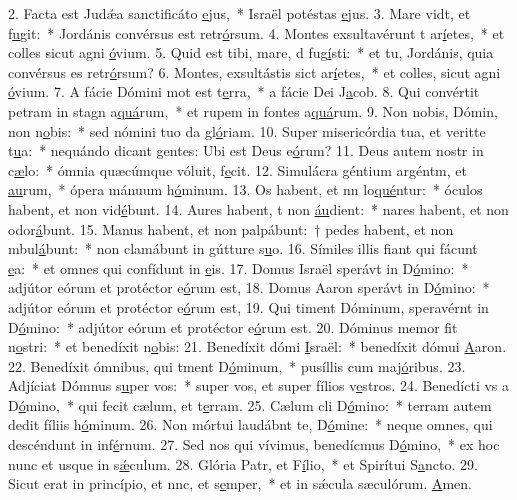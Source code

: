 2. Facta est Judǽa sanctificáto \uline{e}jus,~* Israël potéstas \uline{e}jus.
3. Mare vidt, et f\uline{u}git:~* Jordánis convérsus est retr\uline{ó}rsum.
4. Montes exsultavérunt t ar\uline{í}etes,~* et colles sicut agni \uline{ó}vium.
5. Quid est tibi, mare, d fug\uline{í}sti:~* et tu, Jordánis, quia convérsus es retr\uline{ó}rsum?
6. Montes, exsultástis sict ar\uline{í}etes,~* et colles, sicut agni \uline{ó}vium.
7. A fácie Dómini mot est t\uline{e}rra,~* a fácie Dei J\uline{a}cob.
8. Qui convértit petram in stagn a\uline{quá}rum,~* et rupem in fontes a\uline{quá}rum.
9. Non nobis, Dómin, non n\uline{o}bis:~* sed nómini tuo da gl\uline{ó}riam.
10. Super misericórdia tua, et veritte t\uline{u}a:~* nequándo dicant gentes: Ubi est Deus e\uline{ó}rum?
11. Deus autem nostr in c\uline{æ}lo:~* ómnia quæcúmque vóluit, f\uline{e}cit.
12. Simulácra géntium argéntm, et \uline{au}rum,~* ópera mánuum h\uline{ó}minum.
13. Os habent, et nn lo\uline{qué}ntur:~* óculos habent, et non vid\uline{é}bunt.
14. Aures habent, t non \uline{áu}dient:~* nares habent, et non odor\uline{á}bunt.
15. Manus habent, et non palpábunt:~† pedes habent, et non mbul\uline{á}bunt:~* non clamábunt in gútture s\uline{u}o.
16. Símiles illis fiant qui fácunt \uline{e}a:~* et omnes qui confídunt in \uline{e}is.
17. Domus Israël sperávt in D\uline{ó}mino:~* adjútor eórum et protéctor e\uline{ó}rum est,
18. Domus Aaron sperávt in D\uline{ó}mino:~* adjútor eórum et protéctor e\uline{ó}rum est,
19. Qui timent Dóminum, speravérnt in D\uline{ó}mino:~* adjútor eórum et protéctor e\uline{ó}rum est.
20. Dóminus memor fit n\uline{o}stri:~* et benedíxit n\uline{o}bis:
21. Benedíxit dómi \uline{I}sraël:~* benedíxit dómui \uline{A}aron.
22. Benedíxit ómnibus, qui tment D\uline{ó}minum,~* pusíllis cum maj\uline{ó}ribus.
23. Adjíciat Dómnus s\uline{u}per vos:~* super vos, et super fílios v\uline{e}stros.
24. Benedícti vs a D\uline{ó}mino,~* qui fecit cælum, et t\uline{e}rram.
25. Cælum cli D\uline{ó}mino:~* terram autem dedit fíliis h\uline{ó}minum.
26. Non mórtui laudábnt te, D\uline{ó}mine:~* neque omnes, qui descéndunt in inf\uline{é}rnum.
27. Sed nos qui vívimus, benedícmus D\uline{ó}mino,~* ex hoc nunc et usque in s\uline{ǽ}culum.
28. Glória Patr, et F\uline{í}lio,~* et Spirítui S\uline{a}ncto.
29. Sicut erat in princípio, et nnc, et s\uline{e}mper,~* et in sǽcula sæculórum. \uline{A}men.
